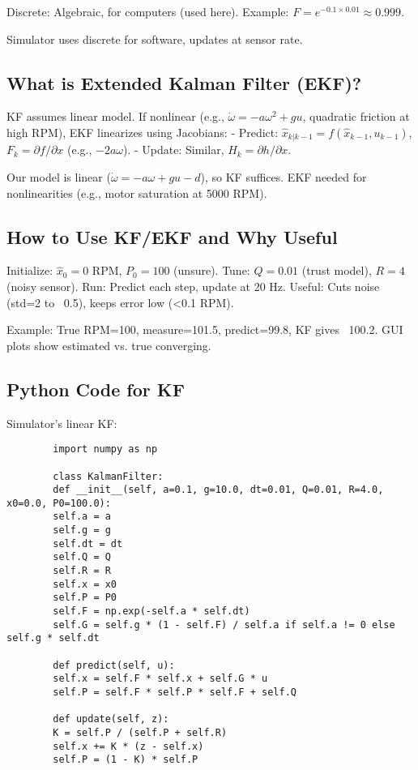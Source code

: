 \documentclass[conference]{IEEEtran}
\begin{document}
	Discrete: Algebraic, for computers (used here). Example: $F = e^{-0.1 \times 0.01} \approx 0.999$.
	
	Simulator uses discrete for software, updates at sensor rate.
	
	\subsection{What is Extended Kalman Filter (EKF)?}
	KF assumes linear model. If nonlinear (e.g., $\dot{\omega} = -a \omega^2 + g u$, quadratic friction at high RPM), EKF linearizes using Jacobians:
	- Predict: $\hat{x}_{k|k-1} = f(\hat{x}_{k-1}, u_{k-1})$, $F_k = \partial f / \partial x$ (e.g., $-2a \omega$).
	- Update: Similar, $H_k = \partial h / \partial x$.
	
	Our model is linear ($\dot{\omega} = -a \omega + g u - d$), so KF suffices. EKF needed for nonlinearities (e.g., motor saturation at 5000 RPM).
	
	\subsection{How to Use KF/EKF and Why Useful}
	Initialize: $\hat{x}_0=0$ RPM, $P_0=100$ (unsure). Tune: $Q=0.01$ (trust model), $R=4$ (noisy sensor). Run: Predict each step, update at 20 Hz. Useful: Cuts noise (std=2 to ~0.5), keeps error low (<0.1 RPM).
	
	Example: True RPM=100, measure=101.5, predict=99.8, KF gives ~100.2. GUI plots show estimated vs. true converging.
	
	\subsection{Python Code for KF}
	Simulator's linear KF:
	
	\begin{lstlisting}
		import numpy as np
		
		class KalmanFilter:
		def __init__(self, a=0.1, g=10.0, dt=0.01, Q=0.01, R=4.0, x0=0.0, P0=100.0):
		self.a = a
		self.g = g
		self.dt = dt
		self.Q = Q
		self.R = R
		self.x = x0
		self.P = P0
		self.F = np.exp(-self.a * self.dt)
		self.G = self.g * (1 - self.F) / self.a if self.a != 0 else self.g * self.dt
		
		def predict(self, u):
		self.x = self.F * self.x + self.G * u
		self.P = self.F * self.P * self.F + self.Q
		
		def update(self, z):
		K = self.P / (self.P + self.R)
		self.x += K * (z - self.x)
		self.P = (1 - K) * self.P
	\end{lstlisting}
	
\end{document}
